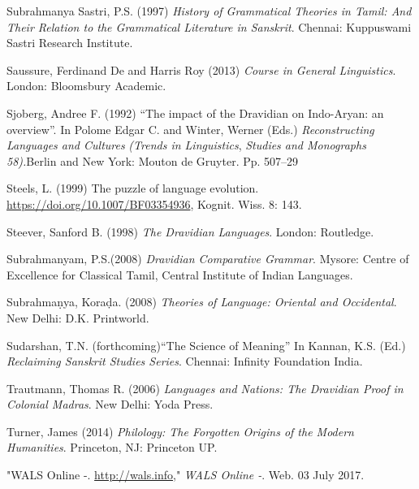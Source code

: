 \begin{thebibliography}{99}
  Subrahmanya Sastri, P.S. (1997) \textit{History of Grammatical Theories in Tamil: And Their Relation to the Grammatical Literature in Sanskrit}. Chennai: Kuppuswami Sastri Research Institute.

  Saussure, Ferdinand De and Harris Roy (2013) \textit{Course in General Linguistics}. London: Bloomsbury Academic.

  Sjoberg, Andree F. (1992) “The impact of the Dravidian on Indo-Aryan: an overview”. In Polome Edgar C. and Winter, Werner (Eds.) \textit{Reconstructing Languages and Cultures} \textit{(Trends in Linguistics}, \textit{Studies and Monographs 58).}Berlin and New York: Mouton de Gruyter. Pp. 507–29

  Steels, L. (1999) The puzzle of language evolution. \url{ https://doi.org/10.1007/BF03354936}, Kognit. Wiss. 8: 143.

  Steever, Sanford B. (1998) \textit{The Dravidian Languages}. London: Routledge.

  Subrahmanyam, P.S.(2008) \textit{Dravidian Comparative Grammar}. Mysore: Centre of Excellence for Classical Tamil, Central Institute of Indian Languages.

  Subrahmaṇya, Koraḍa. (2008) \textit{Theories of Language: Oriental and Occidental}. New Delhi: D.K. Printworld.

  Sudarshan, T.N. (forthcoming)“The Science of Meaning” In Kannan, K.S. (Ed.) \textit{Reclaiming Sanskrit Studies Series}. Chennai: Infinity Foundation India.

  Trautmann, Thomas R. (2006) \textit{Languages and Nations: The Dravidian Proof in Colonial Madras}. New Delhi: Yoda Press.

  Turner, James (2014) \textit{Philology: The Forgotten Origins of the Modern Humanities}. Princeton, NJ: Princeton UP.

  "WALS Online -. \url{http://wals.info}," \textit{WALS Online -}. Web. 03 July 2017.

 \end{thebibliography}

\theendnotes

